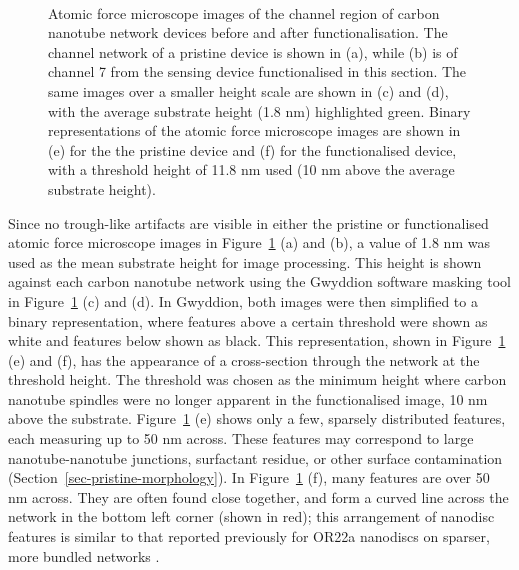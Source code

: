 \documentclass[
  a4paper,
]{scrbook}
\begin{document}
\begin{figure}
\begin{minipage}[t]{0.01\linewidth}
{\centering 

~

}

\end{minipage}%

\caption{\label{fig-working-OR22a-AFM}Atomic force microscope images of
the channel region of carbon nanotube network devices before and after
functionalisation. The channel network of a pristine device is shown in
(a), while (b) is of channel 7 from the sensing device functionalised in
this section. The same images over a smaller height scale are shown in
(c) and (d), with the average substrate height (1.8 nm) highlighted
green. Binary representations of the atomic force microscope images are
shown in (e) for the the pristine device and (f) for the functionalised
device, with a threshold height of 11.8 nm used (10 nm above the average
substrate height).}

\end{figure}

Since no trough-like artifacts are visible in either the pristine or
functionalised atomic force microscope images in
Figure~\ref{fig-working-OR22a-AFM} (a) and (b), a value of 1.8 nm was
used as the mean substrate height for image processing. This height is
shown against each carbon nanotube network using the Gwyddion software
masking tool in Figure~\ref{fig-working-OR22a-AFM} (c) and (d). In
Gwyddion, both images were then simplified to a binary representation,
where features above a certain threshold were shown as white and
features below shown as black. This representation, shown in
Figure~\ref{fig-working-OR22a-AFM} (e) and (f), has the appearance of a
cross-section through the network at the threshold height. The threshold
was chosen as the minimum height where carbon nanotube spindles were no
longer apparent in the functionalised image, 10 nm above the substrate.
Figure~\ref{fig-working-OR22a-AFM} (e) shows only a few, sparsely
distributed features, each measuring up to 50 nm across. These features
may correspond to large nanotube-nanotube junctions, surfactant residue,
or other surface contamination (Section~\ref{sec-pristine-morphology}).
In Figure~\ref{fig-working-OR22a-AFM} (f), many features are over 50 nm
across. They are often found close together, and form a curved line
across the network in the bottom left corner (shown in red); this
arrangement of nanodisc features is similar to that reported previously
for OR22a nanodiscs on sparser, more bundled networks
\autocite{Murugathas2019a}.
\end{document}
